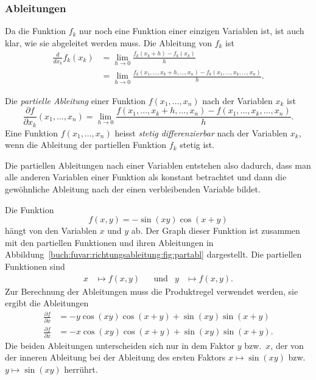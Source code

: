 %
%
\subsubsection{Ableitungen}
Da die Funktion $f_k$ nur noch eine Funktion einer einzigen Variablen
ist, ist auch klar, wie sie abgeleitet werden muss.
Die Ableitung von $f_k$ ist
\begin{align*}
\frac{d}{dx_k} f_k(x_k)
&=
\lim_{h\to 0} \frac{f_k(x_k+h)-f_k(x_k)}{h}
\\
&=
\lim_{h\to 0}
\frac{f_k(x_1,\dots,x_k+h,\dots,x_n)-f_k(x_1,\dots,x_k,\dots,x_n)}{h}.
\end{align*}

\begin{definition}
\label{buch:fuvar:richtungsbleitung:def:partielleableitung}
Die {\em partielle Ableitung} einer Funktion $f(x_1,\dots,x_n)$ nach der
%
%
Variablen $x_k$ ist
\[
\frac{\partial f}{\partial x_k}(x_1,\dots,x_n)
=
\lim_{h\to 0}
\frac{f(x_1,\dots,x_k+h,\dots,x_n)-f(x_1,\dots,x_k,\dots,x_n)}{h}.
\]
Eine Funktion $f(x_1,\dots,x_n)$ heisst {\em stetig differenzierbar}
nach der Variablen $x_k$, wenn die Ableitung der partiellen Funktion 
$f_k$ stetig ist.
\end{definition}

Die partiellen Ableitungen nach einer Variablen entstehen also dadurch,
dass man alle anderen Variablen einer Funktion als konstant betrachtet
und dann die gewöhnliche Ableitung nach der einen verbleibenden Variable
bildet.

\begin{beispiel}
\label{buch:fuvar:richtungsableitung:beispiel:sincos}
Die Funktion
\[
f(x,y)
=
-\sin(xy)\cos(x+y)
\]
hängt von den Variablen $x$ und $y$ ab.
Der Graph dieser Funktion ist zusammen mit den partiellen
Funktionen und ihren Ableitungen in
Abbildung~\ref{buch:fuvar:richtungsableitung:fig:partabl}
dargestellt.
Die partiellen Funktionen sind
\begin{align*}
x&\mapsto f(x,y)
&&\text{und}&
y&\mapsto f(x,y).
\end{align*}
Zur Berechnung der Ableitungen muss die Produktregel verwendet
werden, sie ergibt die Ableitungen
\begin{align*}
\frac{\partial f}{\partial x}
&=
-y\cos(xy)\cos(x+y) +\sin(xy)\sin(x+y)
\\
\frac{\partial f}{\partial x}
&=
-x\cos(xy)\cos(x+y) +\sin(xy)\sin(x+y).
\end{align*}
Die beiden Ableitungen unterscheiden sich nur in dem Faktor $y$ bzw.~$x$,
der von der inneren Ableitung bei der Ableitung des ersten Faktors
$x\mapsto\sin(xy)$ bzw.~$y\mapsto\sin(xy)$ herrührt.
\end{beispiel}

